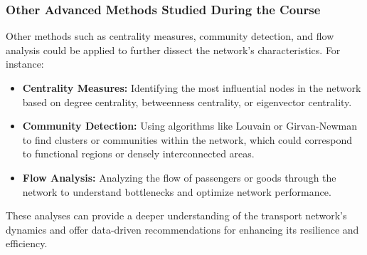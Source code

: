 \subsubsection*{Other Advanced Methods Studied During the Course}
Other methods such as centrality measures, community detection, and flow analysis could be applied to further dissect the network's characteristics. For instance:
\begin{itemize}
    \item \textbf{Centrality Measures:} Identifying the most influential nodes in the network based on degree centrality, betweenness centrality, or eigenvector centrality.
    \item \textbf{Community Detection:} Using algorithms like Louvain or Girvan-Newman to find clusters or communities within the network, which could correspond to functional regions or densely interconnected areas.
    \item \textbf{Flow Analysis:} Analyzing the flow of passengers or goods through the network to understand bottlenecks and optimize network performance.
\end{itemize}

These analyses can provide a deeper understanding of the transport network's dynamics and offer data-driven recommendations for enhancing its resilience and efficiency.